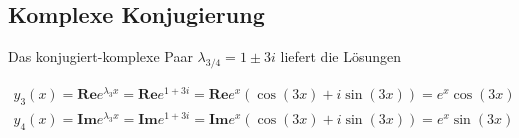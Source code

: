 \documentclass{article}
\begin{document}
\subsection{Komplexe Konjugierung}

Das konjugiert-komplexe Paar $\lambda_{3/4} = 1 \pm 3i$ liefert die Lösungen

\begin{align*}
    y_3(x) = \textbf{Re}e^{\lambda_3 x} = \textbf{Re}e^{1+3i} = \textbf{Re}e^x(\cos(3x) + i\sin(3x)) = e^x\cos(3x) \\ 
    y_4(x) = \textbf{Im}e^{\lambda_3 x} = \textbf{Im}e^{1+3i} = \textbf{Im}e^x(\cos(3x) + i\sin(3x)) = e^x\sin(3x) \\ 
\end{align*}
\end{document}
